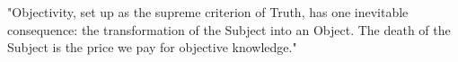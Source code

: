 %
%
%
%
%
"Objectivity, set up as the supreme criterion of Truth, has one inevitable consequence: the transformation of the Subject into an Object. The death of the Subject is the price we pay for objective knowledge." \autocite{Nicolescu2010}
